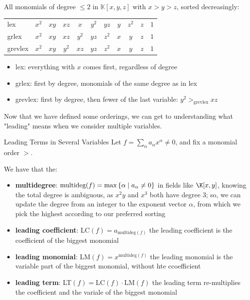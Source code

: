 \documentclass[a4paper, 11pt]{report}
\begin{document}
All monomials of degree $\le 2$ in $\mathbb{K}[x, y, z]$ with $x > y > z$, sorted decreasingly:

\begin{center}
\renewcommand{\arraystretch}{1.3}
\begin{tabular}{l cccccccccc}
\hline
lex     & $x^2$ & $xy$ & $xz$ & $x$ & $y^2$ & $yz$ & $y$ & $z^2$ & $z$ & $1$ \\
grlex   & $x^2$ & $xy$ & $xz$ & $y^2$ & $yz$ & $z^2$ & $x$ & $y$ & $z$ & $1$ \\
grevlex & $x^2$ & $xy$ & ${y^2}$ & ${xz}$ & $yz$ & $z^2$ & $x$ & $y$ & $z$ & $1$ \\
\hline
\end{tabular}
\end{center}

\begin{itemize}
    \item lex: everything with $x$ comes first, regardless of degree
    \item grlex: first by degree, monomials of the same degree as in lex
    \item grevlex: first by degree, then fewer of the last variable: $y^2 >_{\mathrm{grevlex}} xz$
\end{itemize}

Now that we have defined some orderings, we can get to understanding what "leading" means when we consider multiple variables.

\begin{defframe}{Leading Terms in Several Variables}{}
    Let $f = \sum_{\alpha} a_{\alpha}x^{\alpha} \neq 0$, and fix a monomial order $>$.

    We have that the:
    \begin{itemize}
        \item \textbf{multidegree}: $\text{multideg}(f) = \max \set{\alpha}[a_{\alpha} \neq 0]$
            \subitem in fields like $\K[x, y]$, knowing the total degree is ambiguous, as $x^{2}y$ and $x^{3}$ both have degree $3$; so, we can update the degree from an integer to the exponent vector $\alpha$, from which we pick the highest according to our preferred sorting 
        \item \textbf{leading coefficient}: LC$(f) = a_{\text{multideg}(f)}$
            \subitem the leading coefficient is the coefficient of the biggest monomial
        \item \textbf{leading monomial}: LM$(f) = x^{\text{multideg}(f)}$
            \subitem the leading monomial is the variable part of the biggest monomial, without hte ccoefficient
        \item \textbf{leading term}: LT$(f) = \text{LC}(f) \cdot \text{LM}(f)$
            \subitem the leading term re-multiplies the coefficient and the variale of the biggest monomial
    \end{itemize}
\end{defframe}
\end{document}
